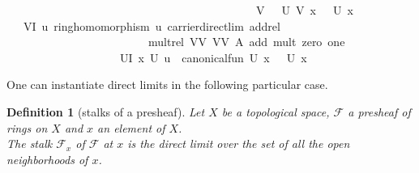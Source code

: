 \documentclass[12pt]{scrartcl}
\newtheorem{definition}[proposition]{Definition}
\begin{document}
\begin{isabelle}
\ \ \ \ \ \ \ \ \ \ \ \ \ \ \ \ \ \ \ \ \ \ \ \ \ \ \ \ \ \ \ \ \ \ \ \ \ \ \ \ \ \ {\isasymLongrightarrow}\ {\isacharparenleft}{\kern0pt}{\isasympsi}\ V\ {\isasymcirc}\ {\isasymrho}\ U\ V{\isacharparenright}{\kern0pt}\ x\ {\isacharequal}{\kern0pt}\ {\isasympsi}\ U\ x{\isachardoublequoteclose}\isanewline
\ \ \ {\isachardoublequoteopen}{\isasymforall}V{\isasymin}I{\isachardot}{\kern0pt}\ {\isasymexists}{\isacharbang}{\kern0pt}u{\isachardot}{\kern0pt}\ ring{\isacharunderscore}{\kern0pt}homomorphism\ u\ carrier{\isacharunderscore}{\kern0pt}direct{\isacharunderscore}{\kern0pt}lim\ add{\isacharunderscore}{\kern0pt}rel\ \isanewline
\ \ \ \ \ \ \ \ \ \ \ \ \ \ \ \ \ \ \ \ \ \ \ \ \ mult{\isacharunderscore}{\kern0pt}rel\ {\isasymlfloor}V{\isacharcomma}{\kern0pt}{\isasymzero}\isactrlbsub V\isactrlesub {\isasymrfloor}\ {\isasymlfloor}V{\isacharcomma}{\kern0pt}{\isasymone}\isactrlbsub V\isactrlesub {\isasymrfloor}\ A\ add\ mult\ zero\ one\isanewline
\ \ \ \ \ \ \ \ \ \ \ \ \ \ \ \ \ \ \ {\isasymand}\ {\isacharparenleft}{\kern0pt}{\isasymforall}U{\isasymin}I{\isachardot}{\kern0pt}\ {\isasymforall}x{\isasymin}{\isacharparenleft}{\kern0pt}{\isasymFF}\ U{\isacharparenright}{\kern0pt}{\isachardot}{\kern0pt}\ {\isacharparenleft}{\kern0pt}u\ {\isasymcirc}\ canonical{\isacharunderscore}{\kern0pt}fun\ U{\isacharparenright}{\kern0pt}\ x\ {\isacharequal}{\kern0pt}\ {\isasympsi}\ U\ x{\isacharparenright}{\kern0pt}{\isachardoublequoteclose}
\end{isabelle}

One can instantiate direct limits in the following particular case.

\begin{definition}[stalks of a presheaf]
	Let $X$ be a topological space, $\mathscr{F}$ a presheaf of rings on $X$ and $x$ an element of $X$. \\
	The stalk $\mathscr{F}_x$ of $\mathscr{F}$ at $x$ is the direct limit over the set of all the open neighborhoods of $x$.   
\end{definition}

\end{document}
